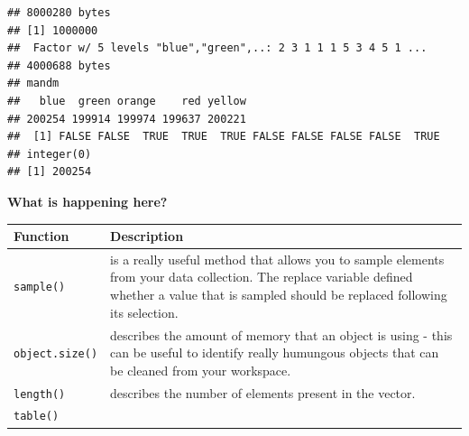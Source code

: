 \documentclass[a4paper]{book}
\begin{document}
\begin{verbatim}
## 8000280 bytes
## [1] 1000000
##  Factor w/ 5 levels "blue","green",..: 2 3 1 1 1 5 3 4 5 1 ...
## 4000688 bytes
## mandm
##   blue  green orange    red yellow 
## 200254 199914 199974 199637 200221 
##  [1] FALSE FALSE  TRUE  TRUE  TRUE FALSE FALSE FALSE FALSE  TRUE
## integer(0)
## [1] 200254
\end{verbatim}

\textbf{What is happening here?}

\begin{longtable}[]{@{}ll@{}}
\toprule
\begin{minipage}[b]{0.21\columnwidth}\raggedright\strut
Function\strut
\end{minipage} & \begin{minipage}[b]{0.73\columnwidth}\raggedright\strut
Description\strut
\end{minipage}\tabularnewline
\midrule
\endhead
\begin{minipage}[t]{0.21\columnwidth}\raggedright\strut
\texttt{sample()}\strut
\end{minipage} & \begin{minipage}[t]{0.73\columnwidth}\raggedright\strut
is a really useful method that allows you to sample elements from your
data collection. The replace variable defined whether a value that is
sampled should be replaced following its selection.\strut
\end{minipage}\tabularnewline
\begin{minipage}[t]{0.21\columnwidth}\raggedright\strut
\texttt{object.size()}\strut
\end{minipage} & \begin{minipage}[t]{0.73\columnwidth}\raggedright\strut
describes the amount of memory that an object is using - this can be
useful to identify really humungous objects that can be cleaned from
your workspace.\strut
\end{minipage}\tabularnewline
\begin{minipage}[t]{0.21\columnwidth}\raggedright\strut
\texttt{length()}\strut
\end{minipage} & \begin{minipage}[t]{0.73\columnwidth}\raggedright\strut
describes the number of elements present in the vector.\strut
\end{minipage}\tabularnewline
\begin{minipage}[t]{0.21\columnwidth}\raggedright\strut
\texttt{table()}\strut
\end{minipage} & \begin{minipage}[t]{0.73\columnwidth}\raggedright\strut

\end{minipage}
\end{longtable}
\end{document}
